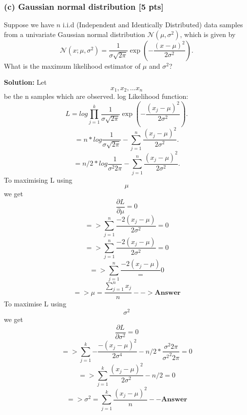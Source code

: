\documentclass[twoside,10pt]{article}
\begin{document}
\vspace{1cm}

\subsubsection*{(c) Gaussian normal distribution [5 pts]}
Suppose we have $n$ i.i.d (Independent and Identically Distributed)
data samples from a univariate Gaussian normal distribution
$\mathcal{N}(\mu, \sigma^2)$, which is given by
\begin{equation}
\mathcal{N}(x; \mu, \sigma^2) = \frac{1}{\sigma \sqrt{2\pi}} \exp
\left( - \frac{(x - \mu)^2}{2\sigma^2} \right).\nonumber
\end{equation}
What is the maximum likelihood estimator of $\mu$ and $\sigma^2$?

\textbf{Solution:}
Let $$x_1,x_2,...x_n$$ be the n samples which are observed.
log Likelihood function:
\begin{equation}\nonumber
L = log\prod_{j=1}^{k}{\frac{1}{\sigma \sqrt{2\pi}}}\exp
\left( - \frac{(x_j - \mu)^2}{2\sigma^2} \right).
\end{equation}
\begin{equation}\nonumber
= n*log{\frac{1}{\sigma \sqrt{2\pi}}} - \sum_{j = 1}^{n}\frac{(x_j - \mu)^2}{2\sigma^2} .
\end{equation}
\begin{equation}\nonumber
= n/2*log{\frac{1}{\sigma^2 2\pi}} - \sum_{j = 1}^{n}\frac{(x_j  - \mu)^2}{2\sigma^2} .
\end{equation}
To maximising L using $$\mu$$ we get
\begin{equation}\nonumber
\frac{\partial L}{\partial \mu}= 0
\end{equation}
\begin{equation}\nonumber
=>\sum_{j = 1}^{n}\frac{-2(x_j - \mu)}{2\sigma^2}= 0
\end{equation}
\begin{equation}\nonumber
=>\sum_{j = 1}^{n}\frac{-2(x_j - \mu)}{2\sigma^2}= 0
\end{equation}
\begin{equation}\nonumber
=>\sum_{j = 1}^{n}\frac{-2(x_j - \mu)} = 0
\end{equation}
\begin{equation}\nonumber
=>\mu = \frac{\sum_{j=1}^{n}x_j}{n} --> \textbf{Answer}
\end{equation}
To maximise L using $$\sigma^2$$ we get
\begin{equation}\nonumber
\frac{\partial L}{\partial \sigma^2}= 0
\end{equation}
\begin{equation}\nonumber
=> \sum_{j = 1}^{k}{-\frac{-(x_j-\mu)^2}{2\sigma^4}} - n/2*\frac{\sigma^2 2\pi}{{\sigma^2}^2 2\pi}= 0
\end{equation}
\begin{equation}\nonumber
=> \sum_{j = 1}^{k}{\frac{(x_j-\mu)^2}{2\sigma^2}} - n/2= 0
\end{equation}
\begin{equation}\nonumber
=> \sigma^2 = \sum_{j = 1}^{k}{\frac{(x_j-\mu)^2}{n}} -- \textbf{Answer}
\end{equation}
\vspace{1cm}
\end{document}
